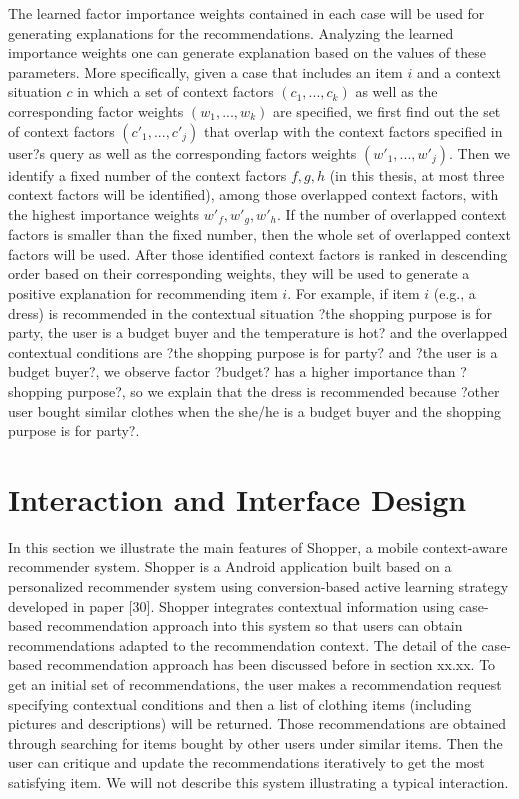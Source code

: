 The learned factor importance weights contained in each case will be used for generating explanations for the recommendations.  Analyzing the learned importance weights one can generate explanation based on the values of these parameters. More specifically, given a case that includes an item $i$ and a context situation $c$ in which a set of context factors $(c_1, ..., c_k)$ as well as the corresponding factor weights $(w_1, ..., w_k)$ are specified, we first find out the set of context factors $(c\prime_1, ..., c\prime_j)$ that overlap with the context factors specified in user?s query as well as the corresponding factors weights $(w\prime_1, ..., w\prime_j)$. Then we identify a fixed number of the context factors $f, g, h$ (in this thesis, at most three context factors will be identified), among those overlapped context factors, with the highest importance weights $w\prime_f, w\prime_g, w\prime_h$. If the number of overlapped context factors is smaller than the fixed number, then the whole set of overlapped context factors will be used. After those identified context factors is ranked in descending order based on their corresponding weights, they will be used to generate a positive explanation for recommending item $i$. For example, if item $i$ (e.g., a dress) is recommended in the contextual situation ?the shopping purpose is for party, the user is a budget buyer and the temperature is hot? and the overlapped contextual conditions are ?the shopping purpose is for party? and ?the user is a budget buyer?, we observe factor ?budget? has a higher importance than ?shopping purpose?, so we explain that the dress is recommended because ?other user bought similar clothes when the she/he is a budget buyer and the shopping purpose is for party?.

\section{Interaction and Interface Design} \label{sec:eg}

In this section we illustrate the main features of Shopper, a mobile context-aware recommender system. Shopper is a Android application built based on a personalized recommender system using conversion-based active learning strategy developed in paper [30]. Shopper integrates contextual information using case-based recommendation approach into this system so that users can obtain recommendations adapted to the recommendation context. The detail of the case-based recommendation approach has been discussed before in section xx.xx. To get an initial set of recommendations, the user makes a recommendation request specifying contextual conditions and then a list of clothing items (including pictures and descriptions) will be returned. Those recommendations are obtained through searching for items bought by other users under similar items. Then the user can critique and update the recommendations iteratively to get the most satisfying item. We will not describe this system illustrating a typical interaction.

